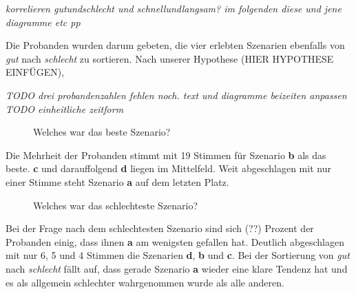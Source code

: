 \documentclass{Paper}
\begin{document}
		
		
		
	\textit{korrelieren gutundschlecht und schnellundlangsam? im folgenden diese und jene diagramme etc pp}


		
		
		Die Probanden wurden darum gebeten, die vier erlebten Szenarien ebenfalls von \textit{gut} nach \textit{schlecht} zu sortieren. Nach unserer Hypothese (HIER HYPOTHESE EINFÜGEN),  


	\textit{TODO drei probandenzahlen fehlen noch. text und diagramme beizeiten anpassen\\
	TODO einheitliche zeitform}

		\begin{figure}[ht]
	\caption{Welches war das beste Szenario?}
	\end{figure}

	Die Mehrheit der Probanden stimmt mit 19 Stimmen für Szenario \textbf{b} als das beste. \textbf{c} und darauffolgend \textbf{d} liegen im Mittelfeld. Weit abgeschlagen mit nur einer Stimme steht Szenario \textbf{a} auf dem letzten Platz.
		
		
		\begin{figure}[ht]
	\caption{Welches war das schlechteste Szenario?}
	\end{figure}
		

	Bei der Frage nach dem schlechtesten Szenario sind sich (??) Prozent der Probanden einig, dass ihnen \textbf{a} am wenigsten gefallen hat. Deutlich abgeschlagen mit nur 6, 5 und 4 Stimmen die Szenarien \textbf{d}, \textbf{b} und \textbf{c}. 
	Bei der Sortierung von \textit{gut} nach \textit{schlecht} fällt auf, dass gerade Szenario \textbf{a} wieder eine klare Tendenz hat und es als allgemein schlechter wahrgenommen wurde als alle anderen. 
\end{document}

